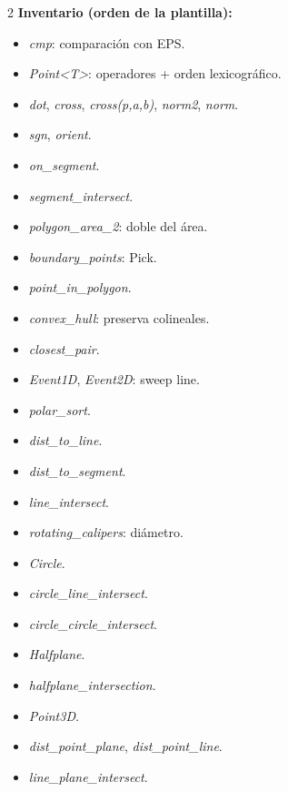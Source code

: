 \documentclass[10pt]{article}
\begin{document}
\begin{multicols}{2}
\textbf{Inventario (orden de la plantilla):}
\begin{itemize}\setlength{\itemsep}{1pt}
  \item \textit{cmp}: comparación con EPS.
  \item \textit{Point<T>}: operadores + orden lexicográfico.
  \item \textit{dot}, \textit{cross}, \textit{cross(p,a,b)}, \textit{norm2}, \textit{norm}.
  \item \textit{sgn}, \textit{orient}.
  \item \textit{on\_segment}.
  \item \textit{segment\_intersect}.
  \item \textit{polygon\_area\_2}: doble del área.
  \item \textit{boundary\_points}: Pick.
  \item \textit{point\_in\_polygon}.
  \item \textit{convex\_hull}: preserva colineales.
  \item \textit{closest\_pair}.
  \item \textit{Event1D}, \textit{Event2D}: sweep line.
  \item \textit{polar\_sort}.
  \item \textit{dist\_to\_line}.
  \item \textit{dist\_to\_segment}.
  \item \textit{line\_intersect}.
  \item \textit{rotating\_calipers}: diámetro.
  \item \textit{Circle}.
  \item \textit{circle\_line\_intersect}.
  \item \textit{circle\_circle\_intersect}.
  \item \textit{Halfplane}.
  \item \textit{halfplane\_intersection}.
  \item \textit{Point3D}.
  \item \textit{dist\_point\_plane}, \textit{dist\_point\_line}.
  \item \textit{line\_plane\_intersect}.
\end{itemize}


\end{multicols}
\end{document}

